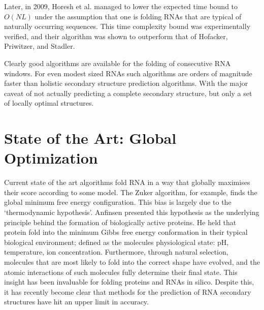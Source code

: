\documentclass{cshonours}
\begin{document}
Later, in 2009, Horesh et al. \cite{horesh2009rnaslider} managed
to lower the expected time bound to $O(NL)$ under the assumption that one is
folding RNAs that are typical of naturally occurring sequences. This time complexity bound was experimentally verified, and their algorithm was shown to outperform that of Hofacker, Priwitzer, and Stadler. 

Clearly good algorithms are
available for the folding of consecutive RNA windows. For even modest sized
RNAs such algorithms are orders of magnitude faster than holistic secondary
structure prediction algorithms. With the major caveat of not actually predicting
a complete secondary structure, but only a set of locally optimal structures.

\section{State of the Art: Global Optimization}
Current state of the art algorithms fold RNA in a way that globally maximises their score according to some model. The Zuker algorithm, for example, finds the global minimum free energy configuration. This bias is largely due to the `thermodynamic hypothesis'. Anfinsen \cite{anfinsen1973principles} presented this hypothesis as the underlying principle behind the formation of biologically active proteins. He held that protein fold into the minimum Gibbs free energy conformation in their typical biological environment; defined as the molecules physiological state: pH, temperature, ion concentration. Furthermore, through natural selection, molecules that are most likely to fold into the correct shape have evolved, and the atomic interactions of such molecules fully determine their final state. This insight has been invaluable for folding proteins and RNAs in silico. Despite this, it has recently become clear that methods for the prediction of RNA secondary structures have hit an upper limit in accuracy.
\end{document}

